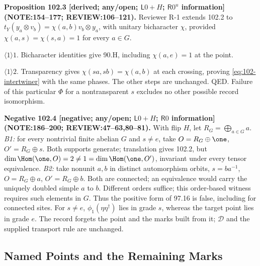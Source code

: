 \textbf{Proposition 102.3 [derived; any/open; \(\mathsf L0+H\); \(\mathsf R0^u\) information]\newline (NOTE:154--177; REVIEW:106--121).}
Reviewer R-1 extends 102.2 to \(t_Y(y_a\otimes v_b)=\chi(a,b)v_b\otimes y_a\), with unitary
bicharacter \(\chi\), provided \(\chi(a,s)=\chi(s,a)=1\) for every \(a\in G\).
\par\(\langle1\rangle1\). Bicharacter identities give 90.H, including \(\chi(a,e)=1\) at the point.
\par\(\langle1\rangle2\). Transparency gives \(\chi(sa,sb)=\chi(a,b)\) at each crossing, proving
\eqref{eq:102-intertwiner} with the same phases. The other steps are unchanged. QED.
Failure of this particular \(\Phi\) for a nontransparent \(s\) excludes no other possible record isomorphism.

\textbf{Negative 102.4 [negative; any/open; \(\mathsf L0+H\); \(\mathsf R0\) information]\newline (NOTE:186--200; REVIEW:47--63,80--81).}
With flip \(H\), let \(R_G=\bigoplus_{a\in G}a\).
\emph{B1:} for every nontrivial finite abelian \(G\) and \(s\ne e\), take
\(O=R_G\oplus\one\), \(O'=R_G\oplus s\). Both supports generate; translation gives 102.2, but
\(\dim\Hom(\one,O)=2\ne1=\dim\Hom(\one,O')\), invariant under every tensor equivalence.
\emph{B2:} take nonunit \(a,b\) in distinct automorphism orbits, \(s=ba^{-1}\),
\(O=R_G\oplus a\), \(O'=R_G\oplus b\). Both are connected; an equivalence would carry the uniquely
doubled simple \(a\) to \(b\). Different orders suffice; this order-based witness requires such elements in \(G\).
Thus the positive form of 97.16 is false, including for connected sites. For \(s\ne e\),
\(\phi_1(\eta\eta^\dagger)\) lies in grade \(s\), whereas the target point lies in grade \(e\).
The record forgets the point and the marks built from it; \(\mathcal D\) and the supplied transport rule are unchanged.

\subsection{Named Points and the Remaining Marks}

